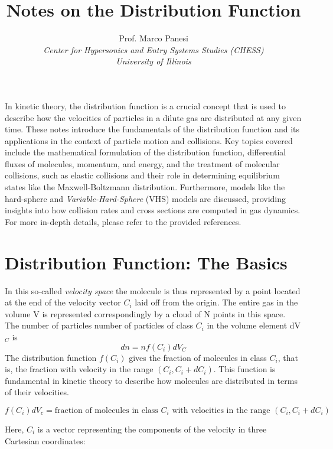 \documentclass{article}
\title{Notes on the Distribution Function}
\author{Prof. Marco Panesi \\
\emph{Center for Hypersonics and Entry Systems Studies (CHESS)}\\
\emph{University of Illinois}}
\date{}
\begin{document}
\maketitle



\tableofcontents

\vspace{0.5cm}

In kinetic theory, the distribution function is a crucial concept that is used to describe how the velocities of particles in a dilute gas are distributed at any given time. These notes introduce the fundamentals of the distribution function and its applications in the context of particle motion and collisions. Key topics covered include the mathematical formulation of the distribution function, differential fluxes of molecules, momentum, and energy, and the treatment of molecular collisions, such as elastic collisions and their role in determining equilibrium states like the Maxwell-Boltzmann distribution. Furthermore, models like the hard-sphere and \emph{Variable-Hard-Sphere} (VHS) models are discussed, providing insights into how collision rates and cross sections are computed in gas dynamics. For more in-depth details, please refer to the provided references.


\section{Distribution Function: The Basics}
In this so-called \emph{velocity space} the molecule is thus represented by a point located at the end of the velocity vector $C_i$ laid off from the origin. The entire gas in the volume V is represented correspondingly by a cloud of N points in this space.\\

The number of particles number of particles of class $C_i$ in the volume element dV$_C$ is
$$
dn = n f(C_i) dV_C
$$
The distribution function \( f(C_i) \) gives the fraction of molecules in class \( C_i \), that is, the fraction with velocity in the range \( (C_i, C_i + dC_i) \). This function is fundamental in kinetic theory to describe how molecules are distributed in terms of their velocities.

\[
f(C_i) dV_c = \text{fraction of molecules in class } C_i \text{ with velocities in the range } (C_i, C_i + dC_i)
\]

Here, \( C_i \) is a vector representing the components of the velocity in three Cartesian coordinates:
\end{document}
